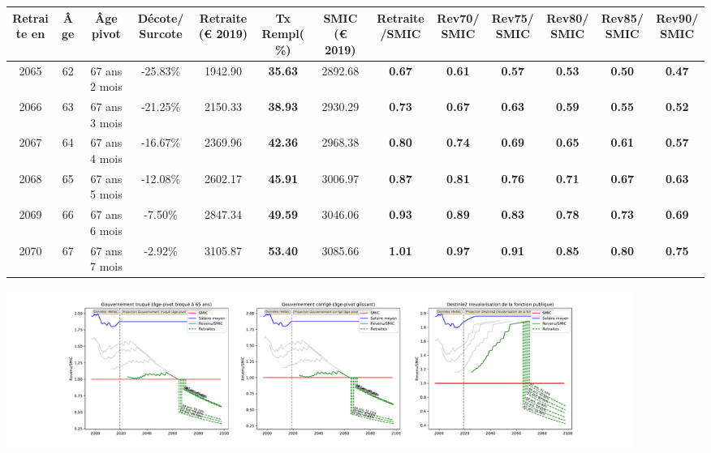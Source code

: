 { \scriptsize \begin{center} 
\begin{tabular}[htb]{|c|c||c|c||c|c||c||c|c|c|c|c|c|} 
\hline 
 Retraite en &  Âge &  Âge pivot &  Décote/Surcote &  Retraite (\euro{} 2019) &  Tx Rempl(\%) &  SMIC (\euro{} 2019) &  Retraite/SMIC &  Rev70/SMIC &  Rev75/SMIC &  Rev80/SMIC &  Rev85/SMIC &  Rev90/SMIC \\ 
\hline \hline 
 2065 &  62 &  67 ans 2 mois &  -25.83\% &  1942.90 &  {\bf 35.63} &  2892.68 &  {\bf {\color{red} 0.67}} &  {\bf {\color{red} 0.61}} &  {\bf {\color{red} 0.57}} &  {\bf {\color{red} 0.53}} &  {\bf {\color{red} 0.50}} &  {\bf {\color{red} 0.47}} \\ 
\hline 
 2066 &  63 &  67 ans 3 mois &  -21.25\% &  2150.33 &  {\bf 38.93} &  2930.29 &  {\bf {\color{red} 0.73}} &  {\bf {\color{red} 0.67}} &  {\bf {\color{red} 0.63}} &  {\bf {\color{red} 0.59}} &  {\bf {\color{red} 0.55}} &  {\bf {\color{red} 0.52}} \\ 
\hline 
 2067 &  64 &  67 ans 4 mois &  -16.67\% &  2369.96 &  {\bf 42.36} &  2968.38 &  {\bf {\color{red} 0.80}} &  {\bf {\color{red} 0.74}} &  {\bf {\color{red} 0.69}} &  {\bf {\color{red} 0.65}} &  {\bf {\color{red} 0.61}} &  {\bf {\color{red} 0.57}} \\ 
\hline 
 2068 &  65 &  67 ans 5 mois &  -12.08\% &  2602.17 &  {\bf 45.91} &  3006.97 &  {\bf {\color{red} 0.87}} &  {\bf {\color{red} 0.81}} &  {\bf {\color{red} 0.76}} &  {\bf {\color{red} 0.71}} &  {\bf {\color{red} 0.67}} &  {\bf {\color{red} 0.63}} \\ 
\hline 
 2069 &  66 &  67 ans 6 mois &  -7.50\% &  2847.34 &  {\bf 49.59} &  3046.06 &  {\bf {\color{red} 0.93}} &  {\bf {\color{red} 0.89}} &  {\bf {\color{red} 0.83}} &  {\bf {\color{red} 0.78}} &  {\bf {\color{red} 0.73}} &  {\bf {\color{red} 0.69}} \\ 
\hline 
 2070 &  67 &  67 ans 7 mois &  -2.92\% &  3105.87 &  {\bf 53.40} &  3085.66 &  {\bf 1.01} &  {\bf {\color{red} 0.97}} &  {\bf {\color{red} 0.91}} &  {\bf {\color{red} 0.85}} &  {\bf {\color{red} 0.80}} &  {\bf {\color{red} 0.75}} \\ 
\hline 
\hline 
\end{tabular} 
\end{center} } 

 \begin{center}\includegraphics[width=0.9\textwidth]{fig/TechHosp_2003_22_dest_retraite.pdf}\end{center} \label{fig/TechHosp_2003_22_dest_retraite.pdf} 

